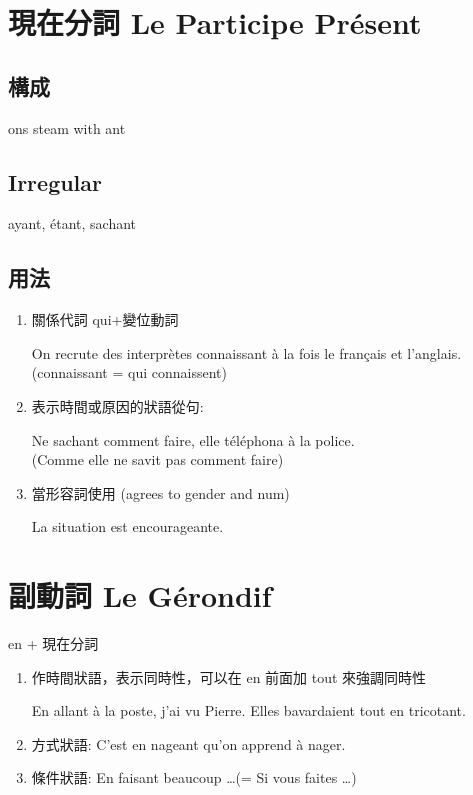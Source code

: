 \documentclass{book}
\begin{document}
    \section{現在分詞 Le Participe Présent}
        \subsection{構成}
            ons steam with ant
        \subsection{Irregular}
            ayant, étant, sachant
        \subsection{用法}
            \begin{enumerate}
                \item 關係代詞 qui+變位動詞
                    \begin{center}
                        On recrute des interprètes connaissant à la fois le français et l'anglais. \\
                        (connaissant = qui connaissent)
                    \end{center}
                \item 表示時間或原因的狀語從句:
                    \begin{center}
                        Ne sachant comment faire, elle téléphona à la police. 
                        \\
                        (Comme elle ne savit pas comment faire)
                    \end{center}
                \item 當形容詞使用 (agrees to gender and num)
                    \begin{center}
                        La situation est encourageante.
                    \end{center}
            \end{enumerate}

    \section{副動詞 Le Gérondif}
        en + 現在分詞
        \begin{enumerate}
            \item 作時間狀語，表示同時性，可以在 en 前面加 tout 來強調同時性
                \begin{center}
                    En allant à la poste, j'ai vu Pierre. Elles bavardaient tout en tricotant.
                \end{center}
            \item 方式狀語: C'est en nageant qu'on apprend à nager.
            \item 條件狀語: En faisant beaucoup \dots (= Si vous faites \dots)
        \end{enumerate}
\end{document}
